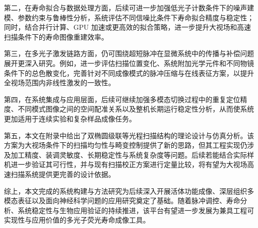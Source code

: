 第二，在寿命拟合与数据处理方面，后续可进一步加强低光子计数条件下的噪声建模、参数约束与鲁棒性分析，系统评估不同信噪比条件下寿命拟合精度与稳定性；同时，结合并行计算、GPU 加速或更高效的拟合策略，进一步提升大视场和高速扫描条件下的寿命图像重建效率。

第三，在多光子激发链路方面，仍可围绕超短脉冲在显微系统中的传播与补偿问题展开更深入研究。例如，进一步评估扫描位置变化、系统附加光学元件和不同物镜条件下的总色散变化，完善针对不同成像模式的脉冲压缩与在线表征方案，以提升全视场范围内非线性激发的一致性。

第四，在系统集成与应用层面，后续可继续加强多模态切换过程中的重复定位精度、不同模式图像之间的空间配准关系以及整机长期运行稳定性分析，从而使系统更加适用于连续实验和复杂样品成像任务。

第五，本文在附录中给出了双椭圆级联等光程扫描结构的理论设计与仿真分析。该方案为大视场条件下的扫描均匀性与畸变控制提供了新的思路，但其工程实现仍涉及加工精度、装调灵敏度、长期稳定性与系统复杂度等问题。后续若能结合实际样机进一步验证其可行性，并与现有扫描校正方案进行定量比较，将有望为大视场高速扫描系统提供更完善的设计依据。

综上，本文完成的系统构建与方法研究为后续深入开展活体功能成像、深层组织多模态表征以及面向神经科学问题的应用研究奠定了基础。随着脉冲调控、寿命分析、系统稳定性与生物应用验证的持续推进，该平台有望进一步发展为兼具工程可实现性与应用价值的多光子荧光寿命成像工具。
